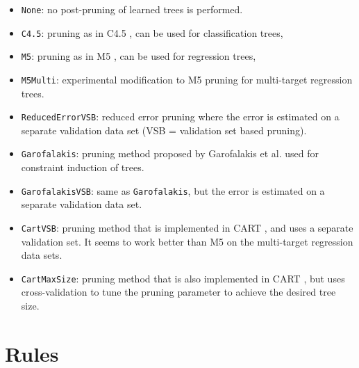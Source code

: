 \documentclass[a4paper]{report}
\begin{document}
\begin{itemize}
\begin{itemize}
		\item \texttt{None}: no post-pruning of learned trees is performed.
		\item \texttt{C4.5}: pruning as in C4.5 \cite{Quinlan1993}, can be used for classification trees,
		\item \texttt{M5}: pruning as in M5 \cite{Quinlan1992},	can be used for regression trees,
		\item \texttt{M5Multi}: experimental modification to M5 \cite{Quinlan1992} pruning for multi-target regression trees.
		\item \texttt{ReducedErrorVSB}: reduced error pruning where the error is estimated on a separate validation data set (VSB = validation set based pruning).
		\item \texttt{Garofalakis}: pruning method proposed by Garofalakis et al. \cite{Garofalakis03:jrnl} used for constraint induction of trees.
		\item \texttt{GarofalakisVSB}: same as \texttt{Garofalakis}, but the error is estimated on a separate validation data set.
		\item \texttt{CartVSB}: pruning method that is implemented in CART \cite{Breiman1984}, and uses a separate validation set. It seems to work better than M5 on the multi-target regression data sets.
		\item \texttt{CartMaxSize}: pruning method that is also implemented in CART \cite{Breiman1984}, but uses cross-validation to tune the pruning parameter to achieve the desired tree size.
	\end{itemize}
\end{itemize}

\section{Rules}

\end{document}
